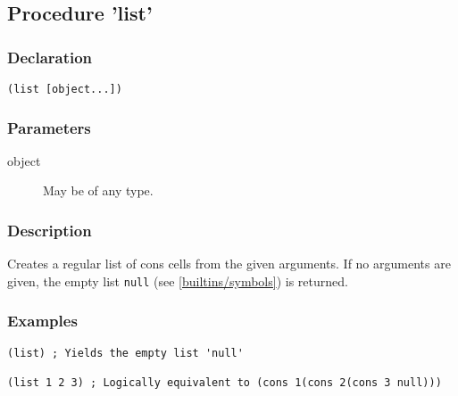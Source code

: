 \subsection{Procedure 'list'}
\label{builtins/list}

\subsubsection*{Declaration}
\begin{lstlisting}
(list [object...])
\end{lstlisting}

\subsubsection*{Parameters}
\begin{description}
	\item[object] May be of any type.
\end{description}

\subsubsection*{Description}
Creates a regular list of cons cells from the given arguments. If no arguments are given, the empty list \lstinline|null| (see \ref{builtins/symbols}) is returned.

\subsubsection*{Examples}
\begin{lstlisting}[escapechar=`]
(list) ; Yields the empty list 'null'

(list 1 2 3) ; Logically equivalent to (cons 1(cons 2(cons 3 null)))
\end{lstlisting}
